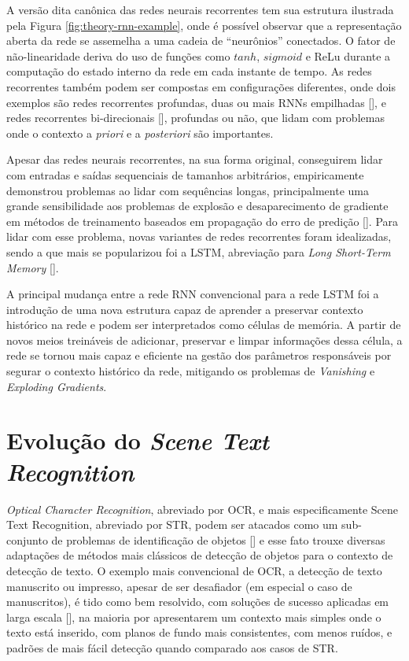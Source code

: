 A versão dita canônica das redes neurais recorrentes tem sua estrutura ilustrada pela Figura \ref{fig:theory-rnn-example}, onde é possível observar que a 
representação aberta da rede se assemelha a uma cadeia de “neurônios” conectados. O fator de não-linearidade deriva do uso de funções como $tanh$, $sigmoid$ 
e ReLu durante a computação do estado interno da rede em cada instante de tempo. As redes recorrentes também podem ser compostas em configurações diferentes, 
onde dois exemplos são redes recorrentes profundas, duas ou mais RNNs empilhadas [], e redes recorrentes bi-direcionais [], 
profundas ou não, que lidam com problemas onde o contexto a \textit{priori} e a \textit{posteriori} são importantes.

Apesar das redes neurais recorrentes, na sua forma original, conseguirem lidar com entradas e saídas sequenciais de tamanhos arbitrários, empiricamente 
demonstrou problemas ao lidar com sequências longas, principalmente uma grande sensibilidade aos problemas de explosão e desaparecimento de gradiente 
em métodos de treinamento baseados em propagação do erro de predição []. Para lidar com esse problema, novas variantes de redes 
recorrentes foram idealizadas, sendo a que mais se popularizou foi a LSTM, abreviação para \textit{Long Short-Term Memory} [].

A principal mudança entre a rede RNN convencional para a rede LSTM foi a introdução de uma nova estrutura capaz de aprender a preservar contexto histórico 
na rede e podem ser interpretados como células de memória. A partir de novos meios treináveis de adicionar, preservar e limpar informações dessa célula, a 
rede se tornou mais capaz e eficiente na gestão dos parâmetros responsáveis por segurar o contexto histórico da rede, mitigando os problemas de 
\textit{Vanishing} e \textit{Exploding Gradients}. 


\section{Evolução do \textit{Scene Text Recognition}}
\textit{Optical Character Recognition}, abreviado por OCR, e mais especificamente Scene Text Recognition, abreviado por STR, podem ser atacados como um 
sub-conjunto de problemas de identificação de objetos [] e esse fato trouxe diversas adaptações de métodos mais clássicos 
de detecção de objetos para o contexto de detecção de texto. O exemplo mais convencional de OCR, a detecção de texto manuscrito ou impresso, apesar de ser 
desafiador (em especial o caso de manuscritos), é tido como bem resolvido, com soluções de sucesso aplicadas em larga escala 
[], na maioria por apresentarem um contexto mais simples onde o texto está inserido, com planos de fundo mais 
consistentes, com menos ruídos, e padrões de mais fácil detecção quando comparado aos casos de STR.

